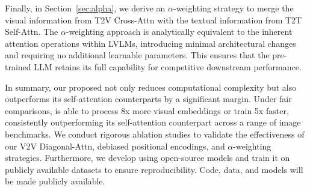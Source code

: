 
Finally, in Section~\ref{sec:alpha}, we derive an $\alpha$-weighting strategy to merge the visual information from T2V Cross-Attn with the textual information from T2T Self-Attn.
The $\alpha$-weighting approach is analytically equivalent to the inherent attention operations within LVLMs, introducing minimal architectural changes and requiring no additional learnable parameters.
This ensures that the pre-trained LLM retains its full capability for competitive downstream performance.


In summary, our proposed \method{} not only reduces computational complexity but also outperforms its self-attention counterparts by a significant margin.
Under fair comparisons, \method{} is able to process 8x more visual embeddings or train 5x faster, consistently outperforming its self-attention counterpart across a range of image benchmarks.
We conduct rigorous ablation studies to validate the effectiveness of our V2V Diagonal-Attn, debiased positional encodings, and $\alpha$-weighting strategies.
Furthermore, we develop \method{} using open-source models and train it on publicly available datasets to ensure reproducibility.
Code, data, and models will be made publicly available.

